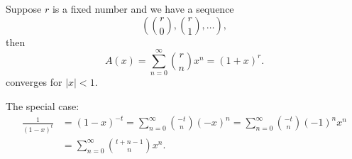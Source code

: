 \begin{eg}
    Suppose \(r\) is a fixed number and we have a sequence 
    \[
        \left( \binom{r}{0}, \binom{r}{1}, \dots  \right),
    \]then 
    \[
        A(x) = \sum_{n=0}^{\infty} \binom{r}{n} x^n = (1 + x)^r.  
    \] converges for \(\vert x \vert < 1 \).
\end{eg}

\begin{remark}
    The special case:
    \begin{align*}
        \frac{1}{(1 - x)^t} &= (1 - x)^{-t} = \sum_{n=0}^{\infty} \binom{-t}{n} (-x)^n = \sum_{n=0}^{\infty} \binom{-t}{n} (-1)^n x^n \\
        &= \sum_{n=0}^{\infty} \binom{t + n - 1}{n} x^n. 
    \end{align*}
\end{remark}

